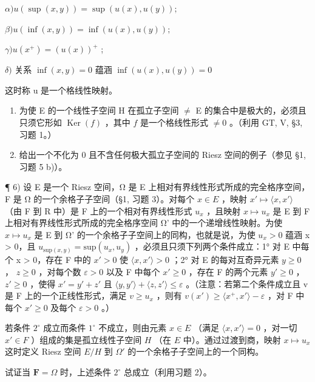 \(\alpha) u(\sup(x, y)) = \sup(u(x), u(y));\)

\(\beta) u(\inf(x, y)) = \inf(u(x), u(y));\)

\(\gamma) u(x^{+}) = (u(x))^{+}\) ;

\(\delta)\) 关系 \(\inf (x,y) = 0\) 蕴涵 \(\inf (u(x),u(y)) = 0\)

这时称 u 是一个格线性映射。

\begin{enumerate}
\def\labelenumi{\alph{enumi})}
\setcounter{enumi}{2}
\item
  为使 E 的一个线性子空间 H 在孤立子空间 \(\neq\) E 的集合中是极大的，必须且只须它形如 \(\operatorname{Ker}(f)\) ，其中 \(f\) 是一个格线性形式 \(\neq 0\) 。（利用 GT, V, §3, 习题 1。）
\item
  给出一个不化为 0 且不含任何极大孤立子空间的 Riesz 空间的例子（参见 §1, 习题 5 b)）。
\end{enumerate}

¶ 6) 设 E 是一个 Riesz 空间，Ω 是 E 上相对有界线性形式所成的完全格序空间，F 是 Ω 的一个余格子子空间（§1, 习题 3）。对每个 \(x \in E\) ，映射 \(x' \mapsto \langle x, x' \rangle\) （由 F 到 R 中）是 F 上的一个相对有界线性形式 \(u_x\) ，且映射 \(x \mapsto u_x\) 是 E 到 F 上相对有界线性形式所成的完全格序空间 Ω' 中的一个递增线性映射。为使 \(x \mapsto u_x\) 是 E 到 Ω' 的一个余格子子空间上的同构，也就是说，为使 \(u_x > 0\) 蕴涵 x \textgreater{} 0，且 \(u_{\text{sup}(x,y)} = \text{sup}(u_x, u_y)\) ，必须且只须下列两个条件成立：1° 对 E 中每个 x \textgreater{} 0，存在 F 中的 \(x' > 0\) 使 \(\langle x, x' \rangle > 0\) ；2° 对 E 的每对互奇异元素 \(y \geqslant 0\) ， \(z \geqslant 0\) ，对每个数 \(\varepsilon > 0\) 以及 F 中每个 \(x' \geqslant 0\) ，存在 F 的两个元素 \(y' \geqslant 0\) ， \(z' \geqslant 0\) ，使得 \(x' = y' + z'\) 且 \(\langle y, y' \rangle + \langle z, z' \rangle \leqslant \varepsilon\) 。（注意：若第二个条件成立且 v 是 F 上的一个正线性形式，满足 \(v \geqslant u_x\) ，则有 \(v(x') \geqslant \langle x^+, x' \rangle - \varepsilon\) ，对 F 中每个 \(x' \geqslant 0\) 及每个 \(\varepsilon > 0\) 。）

若条件 \(2^{\circ}\) 成立而条件 \(1^{\circ}\) 不成立，则由元素 \(x \in E\) （满足 \(\langle x, x' \rangle = 0\) ，对一切 \(x' \in F\) ）组成的集是孤立线性子空间 \(H\) （在 \(E\) 中）。通过过渡到商，映射 \(x \mapsto u_x\) 这时定义 Riesz 空间 \(E / H\) 到 \(\Omega'\) 的一个余格子子空间上的一个同构。

试证当 \(\mathbf{F} = \Omega\) 时，上述条件 \(2^{\circ}\) 总成立（利用习题 2）。

